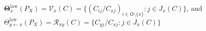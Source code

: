 \(\boldsymbol\Theta_x^{\mathrm{law}}(P_X)=\mathcal V_x(C)=\{(C_{ij}/C_{xj})_{i\in\mathsf O\setminus\{x\}}:j\in J_x(C)\}\), and \(\Theta_{y\leftarrow x}^{\mathrm{law}}(P_X)=\mathcal R_{xy}(C)=\{C_{yj}/C_{xj}:j\in J_x(C)\}\)